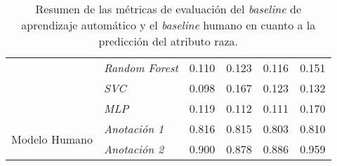 \begin{table}[htpb]
{\begin{tabular}{llcccc}
                                            & \emph{Random Forest}        & 0.110 & 0.123 & 0.116 & 0.151\\
        \cmidrule{2-6}
                                            & \emph{SVC}                  & 0.098 & 0.167 & 0.123 & 0.132\\
        \cmidrule{2-6}
                                            & \emph{MLP}                  & 0.119 & 0.112 & 0.111 & 0.170\\
        \midrule\midrule
        \multirow{2}{*}{Modelo Humano}      & \emph{Anotaci\'on 1}        & 0.816 & 0.815 & 0.803 & 0.810\\
        \cmidrule{2-6}
                                            & \emph{Anotaci\'on 2}        & 0.900 & 0.878 & 0.886 & 0.959\\
        \bottomrule
        \end{tabular}}
    \caption{Resumen de las m\'etricas de evaluaci\'on del \emph{baseline} de aprendizaje autom\'atico y el \emph{baseline} humano 
    en cuanto a la predicci\'on del atributo raza.}
    \label{table:eval_baselines_race}
\end{table}

